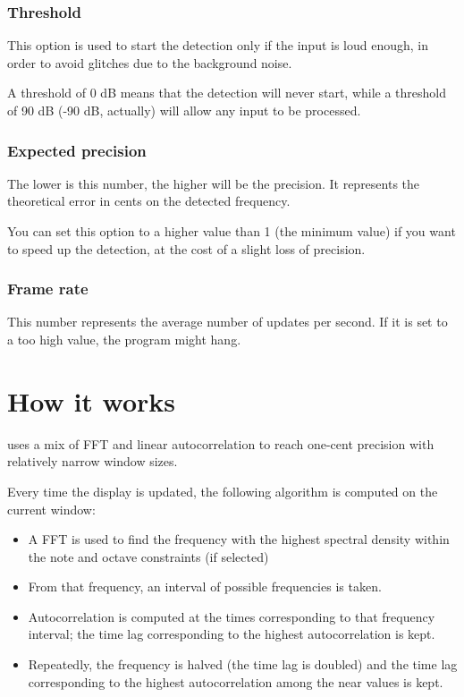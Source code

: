 \subsection{Threshold}\label{threshold}

This option is used to start the detection only if the input is loud enough,
in order to avoid glitches due to the background noise.

A threshold of 0 dB means that the detection will never start, while a threshold
of 90 dB (-90 dB, actually) will allow any input to be processed.

\subsection{Expected precision}\label{expectedprecision}

The lower is this number, the higher will be the precision. It represents the
theoretical error in cents on the detected frequency.

You can set this option to a higher value than 1 (the minimum value)
if you want to speed up the detection, at the cost of a slight loss of precision.

\subsection{Frame rate}\label{framerate}

This number represents the average number of updates per second. If it is set to 
a too high value, the program might hang.

\chapter{How it works}\label{howitworks}

 uses a mix of FFT and linear autocorrelation to reach one-cent precision with relatively narrow window sizes.

Every time the display is updated, the following algorithm is computed on the current window:

\begin{itemize}
  \item A FFT is used to find the frequency with the highest spectral density within the note and octave constraints (if selected)
  \item From that frequency, an interval of possible frequencies is taken.
  \item Autocorrelation is computed at the times corresponding to that frequency interval; the time lag corresponding to the highest autocorrelation is kept.
  \item Repeatedly, the frequency is halved (the time lag is doubled) and the time lag corresponding to the highest autocorrelation among the near values is kept.
\end{itemize}

